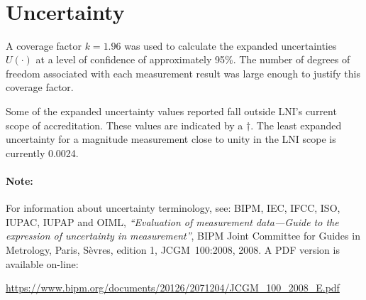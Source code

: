 \documentclass[11pt,a4paper]{article}
\newcommand{\referenceGUM}{%
For information about uncertainty terminology, see: 
BIPM, IEC, IFCC, ISO, IUPAC, IUPAP and OIML, 
\textit{``Evaluation of measurement data---Guide to the expression of uncertainty in measurement''}, 
BIPM Joint Committee for Guides in Metrology, Paris, S\`evres, edition 1, JCGM~100:2008, 2008. 
A PDF version is available on-line:

    \begin{center}
	    \href{%
		https://www.bipm.org/documents/20126/2071204/JCGM_100_2008_E.pdf
	    }{%
		https://www.bipm.org/documents/20126/2071204/JCGM\_100\_2008\_E.pdf
	    }
    \end{center}
}
\begin{document}
\begin{center}
\begin{singlespace}
\[\begin{array}{SSSSS}
		\end{array}
	\]
	
\end{singlespace}
\end{center}


\section{Uncertainty}
A coverage factor $k=1.96$ was used to calculate the expanded uncertainties $U(\cdot)$ at a level of confidence of approximately 95\%. The number of degrees of freedom associated with each measurement result was large enough to justify this coverage factor.  

Some of the expanded uncertainty values reported fall outside LNI's current scope of accreditation. These values are indicated by a $\dagger$. The least expanded uncertainty for a magnitude measurement close to unity in the LNI scope is currently 0.0024. 

\paragraph{Note:} \referenceGUM	%
\end{document}
